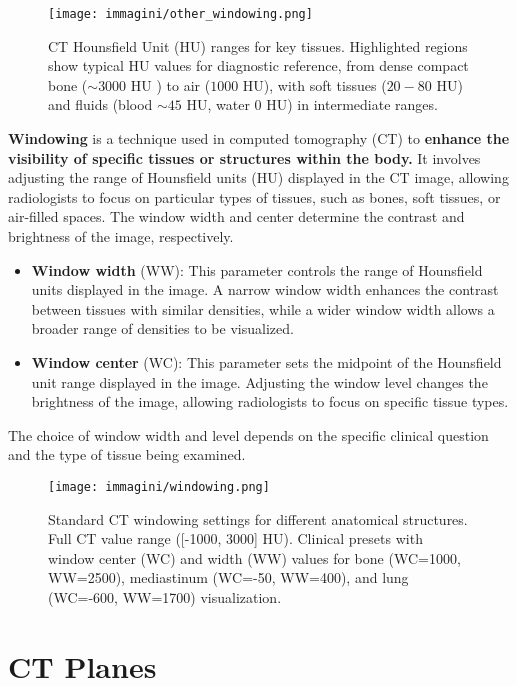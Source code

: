 \begin{figure}[h!]
    \centering
    \texttt{[image: immagini/other\_windowing.png]}
    \caption{CT Hounsfield Unit (HU) ranges for key tissues. Highlighted regions show typical HU values for diagnostic reference, from dense compact bone ($\sim 3000$ HU ) to air ($1000$ HU), with soft tissues ($20-80$ HU) and fluids (blood $\sim 45$ HU, water $0$ HU) in intermediate ranges.}
    \label{fig:general_windowing}
\end{figure}

\textbf{Windowing} is a technique used in computed tomography (CT) to \textbf{enhance the visibility of specific tissues or structures within the body.} It involves adjusting the range of Hounsfield units (HU) displayed in the CT image, allowing radiologists to focus on particular types of tissues, such as bones, soft tissues, or air-filled spaces. The window width and center determine the contrast and brightness of the image, respectively.
\begin{itemize}
    \item \textbf{Window width} (WW): This parameter controls the range of Hounsfield units displayed in the image. A narrow window width enhances the contrast between tissues with similar densities, while a wider window width allows a broader range of densities to be visualized.
    \item \textbf{Window center} (WC): This parameter sets the midpoint of the Hounsfield unit range displayed in the image. Adjusting the window level changes the brightness of the image, allowing radiologists to focus on specific tissue types.
\end{itemize}
The choice of window width and level depends on the specific clinical question and the type of tissue being examined. 


\begin{figure}[h!]
    \centering
    \texttt{[image: immagini/windowing.png]}
    \caption{Standard CT windowing settings for different anatomical structures. Full CT value range ([-1000, 3000] HU). Clinical presets with window center (WC) and width (WW) values for bone (WC=1000, WW=2500), mediastinum (WC=-50, WW=400), and lung (WC=-600, WW=1700) visualization.}
    \label{fig:windowing_lung}
\end{figure}


\section{CT Planes}

